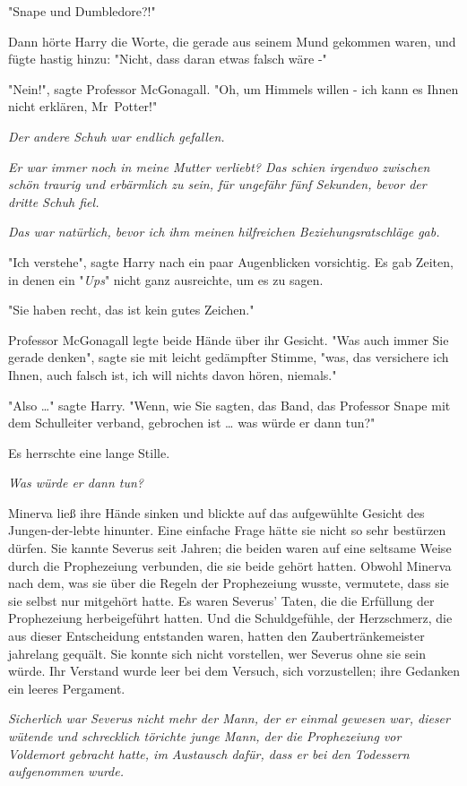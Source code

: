 {"Snape und Dumbledore?!"

Dann hörte Harry die Worte, die gerade aus seinem Mund gekommen waren, und fügte hastig hinzu: "Nicht, dass daran etwas falsch wäre -"

"Nein!", sagte Professor McGonagall. "Oh, um Himmels willen - ich kann es Ihnen nicht erklären, Mr~Potter!"

\emph{Der andere Schuh war endlich gefallen.}

\emph{Er war immer noch in meine Mutter verliebt? Das schien irgendwo zwischen schön traurig und erbärmlich zu sein, für ungefähr fünf Sekunden, bevor der dritte Schuh fiel.}

\emph{Das war natürlich, bevor ich ihm meinen hilfreichen Beziehungsratschläge gab.}

"Ich verstehe", sagte Harry nach ein paar Augenblicken vorsichtig. Es gab Zeiten, in denen ein "\emph{Ups}" nicht ganz ausreichte, um es zu sagen.

"Sie haben recht, das ist kein gutes Zeichen."

Professor McGonagall legte beide Hände über ihr Gesicht. "Was auch immer Sie gerade denken", sagte sie mit leicht gedämpfter Stimme, "was, das versichere ich Ihnen, auch falsch ist, ich will nichts davon hören, niemals."

"Also …" sagte Harry. "Wenn, wie Sie sagten, das Band, das Professor Snape mit dem Schulleiter verband, gebrochen ist … was würde er dann tun?"

Es herrschte eine lange Stille.

\emph{Was würde er dann tun?}

Minerva ließ ihre Hände sinken und blickte auf das aufgewühlte Gesicht des Jungen-der-lebte hinunter. Eine einfache Frage hätte sie nicht so sehr bestürzen dürfen. Sie kannte Severus seit Jahren; die beiden waren auf eine seltsame Weise durch die Prophezeiung verbunden, die sie beide gehört hatten. Obwohl Minerva nach dem, was sie über die Regeln der Prophezeiung wusste, vermutete, dass sie sie selbst nur mitgehört hatte. Es waren Severus' Taten, die die Erfüllung der Prophezeiung herbeigeführt hatten. Und die Schuldgefühle, der Herzschmerz, die aus dieser Entscheidung entstanden waren, hatten den Zaubertränkemeister jahrelang gequält. Sie konnte sich nicht vorstellen, wer Severus ohne sie sein würde. Ihr Verstand wurde leer bei dem Versuch, sich vorzustellen; ihre Gedanken ein leeres Pergament.

\emph{Sicherlich war Severus nicht mehr der Mann, der er einmal gewesen war, dieser wütende und schrecklich törichte junge Mann, der die Prophezeiung vor Voldemort gebracht hatte, im Austausch dafür, dass er bei den Todessern aufgenommen wurde.}

}
